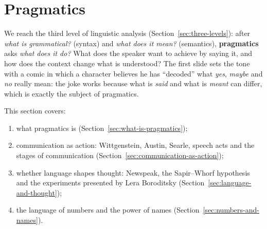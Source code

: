 \section{Pragmatics}
\label{sec:pragmatics}

We reach the third level of linguistic analysis (Section~\ref{sec:three-levels}):
after \emph{what is grammatical?} (syntax) and \emph{what does it mean?} (semantics),
\textbf{pragmatics} asks \emph{what does it do?} What does the speaker want to achieve by
saying it, and how does the context change what is understood? The first slide sets the
tone with a comic in which a character believes he has ``decoded'' what \emph{yes},
\emph{maybe} and \emph{no} really mean: the joke works because what is \emph{said} and
what is \emph{meant} can differ, which is exactly the subject of pragmatics.

This section covers:
\begin{enumerate}[nosep]
  \item what pragmatics is (Section~\ref{sec:what-is-pragmatics});
  \item communication as action: Wittgenstein, Austin, Searle, speech acts and the
        stages of communication (Section~\ref{sec:communication-as-action});
  \item whether language shapes thought: Newspeak, the Sapir--Whorf hypothesis and the
        experiments presented by Lera Boroditsky (Section~\ref{sec:language-and-thought});
  \item the language of numbers and the power of names
        (Section~\ref{sec:numbers-and-names}).
\end{enumerate}






